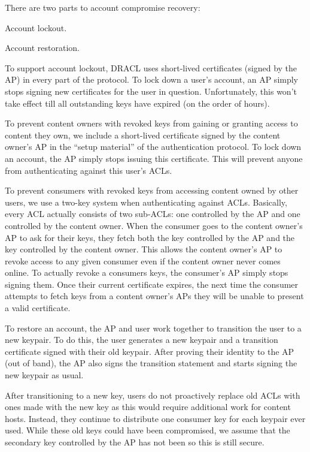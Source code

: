 \documentclass[pdftex,12pt,a4papaer]{report}
\begin{document}
There are two parts to account compromise recovery:

\begin{compactenum}
\item Account lockout.
\item Account restoration.
\end{compactenum}

To support account lockout, DRACL uses short-lived certificates (signed by the
AP) in every part of the protocol. To lock down a user's account, an AP simply
stops signing new certificates for the user in question. Unfortunately, this
won't take effect till all outstanding keys have expired (on the order of
hours).

To prevent content owners with revoked keys from gaining or granting access to
content they own, we include a short-lived certificate signed by the content
owner's AP in the ``setup material'' of the authentication protocol. To lock
down an account, the AP simply stops issuing this certificate. This will prevent
anyone from authenticating against this user's ACLs.

To prevent consumers with revoked keys from accessing content owned by other
users, we use a two-key system when authenticating against ACLs. Basically,
every ACL actually consists of two sub-ACLs: one controlled by the AP and one
controlled by the content owner. When the consumer goes to the content owner's
AP to ask for their keys, they fetch both the key controlled by the AP and the
key controlled by the content owner. This allows the content owner's AP to
revoke access to any given consumer even if the content owner never comes
online. To actually revoke a consumers keys, the consumer's AP simply stops
signing them. Once their current certificate expires, the next time the consumer
attempts to fetch keys from a content owner's APs they will be unable to present
a valid certificate.

To restore an account, the AP and user work together to transition the user to a
new keypair. To do this, the user generates a new keypair and a transition
certificate signed with their old keypair. After proving their identity to the
AP (out of band), the AP also signs the transition statement and starts signing
the new keypair as usual.

After transitioning to a new key, users do not proactively replace old ACLs with
ones made with the new key as this would require additional work for content
hosts. Instead, they continue to distribute one consumer key for each keypair
ever used. While these old keys could have been compromised, we assume that the
secondary key controlled by the AP has not been so this is still secure.
\end{document}
